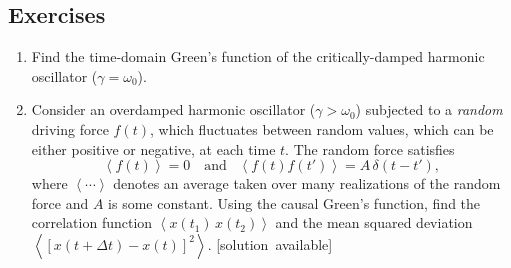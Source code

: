 \documentclass[10pt,a4paper]{article}
\begin{document}
\clearpage
\subsection{Exercises}\label{exercises}

\begin{enumerate}
\item
  Find the time-domain Green's function of the critically-damped
  harmonic oscillator ($\gamma = \omega_0$).
\item
  Consider an overdamped harmonic oscillator ($\gamma > \omega_0$)
  subjected to a \emph{random} driving force $f(t)$, which fluctuates
  between random values, which can be either positive or negative, at
  each time $t$. The random force satisfies
  \begin{equation}
    \left\langle f(t)\right\rangle = 0 \quad\mathrm{and}\;\;\;\left\langle f(t) f(t')\right\rangle = A \, \delta(t-t'),
  \end{equation}
  where $\left\langle\cdots\right\rangle$ denotes an average taken
  over many realizations of the random force and $A$ is some constant.
  Using the causal Green's function, find the correlation function
  $\left\langle x(t_1)\, x(t_2) \right\rangle$ and the mean squared
  deviation $\left\langle [x(t+\Delta t) - x(t)]^2 \right\rangle.$
  \vskip -0.05in
  \hfill{\scriptsize [solution~available]}
\end{enumerate}
\end{document}

